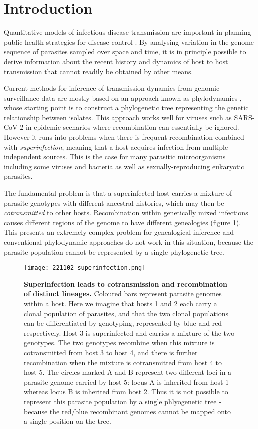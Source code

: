 \documentclass[_main.tex]{subfiles}
\begin{document}
\section*{Introduction}

Quantitative models of infectious disease transmission are important in planning public health strategies for disease control \cite{Ross1915,Smith2012}.  By analysing variation in the genome sequence of parasites sampled over space and time, it is in principle possible to derive information about the recent history and dynamics of host to host transmission that cannot readily be obtained by other means.

Current methods for inference of transmission dynamics from genomic surveillance data are mostly based on an approach known as phylodynamics \cite{Grenfell2004,Volz2013}, whose starting point is to construct a phylogenetic tree representing the genetic relationship between isolates.  This approach works well for viruses such as SARS-CoV-2 in epidemic scenarios where recombination can essentially be ignored.  However it runs into problems when there is frequent recombination combined with \textit{superinfection}, meaning that a host acquires infection from multiple independent sources.  This is the case for many parasitic microorganisms including some viruses and bacteria as well as sexually-reproducing eukaryotic parasites.

The fundamental problem is that a superinfected host carries a mixture of parasite genotypes with different ancestral histories, which may then be \textit{cotransmitted} to other hosts.  Recombination within genetically mixed infections causes different regions of the genome to have different genealogies (figure \ref{fig:superinfection1}).  This presents an extremely complex problem for genealogical inference  \cite{Speidel2019, Kelleher2019} and conventional phylodynamic approaches do not work in this situation, because the parasite population cannot be represented by a single phylogenetic tree.

\begin{figure}[ht]
\centering
\texttt{[image: 221102\_superinfection.png]}
\caption{\textbf{Superinfection leads to cotransmission and recombination of distinct lineages.}  Coloured bars represent parasite genomes within a host.  Here we imagine that hosts 1 and 2 each carry a clonal population of parasites, and that the two clonal populations can be differentiated by genotyping, represented by blue and red respectively.  Host 3 is superinfected and carries a mixture of the two genotypes.  The two genotypes recombine when this mixture is cotransmitted from host 3 to host 4, and there is further recombination when the mixture is cotransmitted from host 4 to host 5.  The circles marked A and B represent two different loci in a parasite genome carried by host 5: locus A is inherited from host 1 whereas locus B is inherited from host 2.  Thus it is not possible to represent this parasite population by a single phlyogenetic tree - because the red/blue recombinant genomes cannot be mapped onto a single position on the tree.}
\label{fig:superinfection1}
\end{figure}
\end{document}
